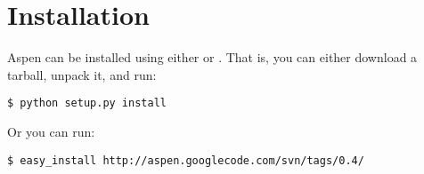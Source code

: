\chapter{Installation \label{installation}}

Aspen can be installed using either  or .
That is, you can either download a tarball, unpack it, and run:

\begin{verbatim}
$ python setup.py install
\end{verbatim}

Or you can run:

\begin{verbatim}
$ easy_install http://aspen.googlecode.com/svn/tags/0.4/
\end{verbatim}
